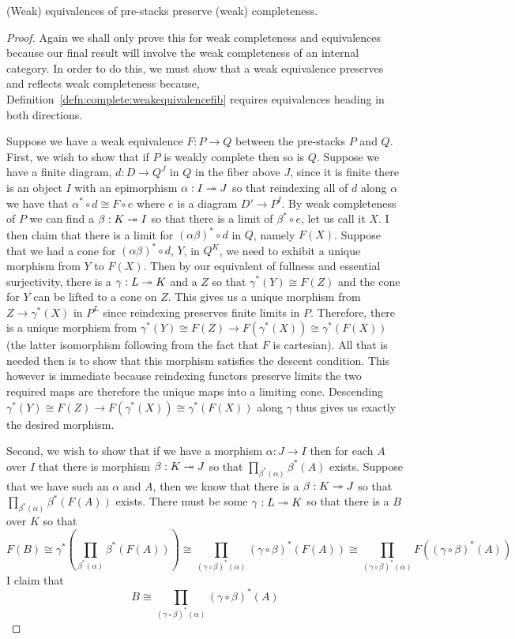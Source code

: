 \begin{thm}\label{prop:complete:completefibrationbroken}
  (Weak) equivalences of pre-stacks preserve (weak) completeness.
\end{thm}
\begin{proof}
  Again we shall only prove this for weak completeness and
  equivalences because our final result will involve the weak
  completeness of an internal category. In order to do this, we must
  show that a weak equivalence preserves and reflects weak
  completeness because,
  Definition~\ref{defn:complete:weakequivalencefib} requires
  equivalences heading in both directions.

  Suppose we have a weak equivalence $F : P \to Q$ between the
  pre-stacks $P$ and $Q$. First, we wish to show that if $P$ is weakly
  complete then so is $Q$. Suppose we have a finite diagram,
  $d : D \to Q^J$ in $Q$ in the fiber above $J$, since it is finite
  there is an object $I$ with an epimorphism $\alpha : I \twoheadrightarrow J$ so
  that reindexing all of $d$ along $\alpha$ we have that
  $\alpha^* \circ d \cong F \circ e$ where $e$ is a diagram
  $D' \to P^I$. By weak completeness of $P$ we can find a
  $\beta : K \twoheadrightarrow I$ so that there is a limit of $\beta^* \circ e$,
  let us call it $X$. I then claim that there is a limit for
  $(\alpha\beta)^* \circ d$ in $Q$, namely $F(X)$. Suppose that we had
  a cone for $(\alpha\beta)^* \circ d$, $Y$, in $Q^K$, we need to
  exhibit a unique morphism from $Y$ to $F(X)$. Then by our equivalent
  of fullness and essential surjectivity, there is a
  $\gamma : L \twoheadrightarrow K$ and a $Z$ so that $\gamma^*(Y) \cong F(Z)$ and
  the cone for $Y$ can be lifted to a cone on $Z$. This gives us a
  unique morphism from $Z \to \gamma^*(X)$ in $P^L$ since reindexing
  preserves finite limits in $P$. Therefore, there is a unique
  morphism from
  $\gamma^*(Y) \cong F(Z) \to F(\gamma^*(X)) \cong \gamma^*(F(X))$
  (the latter isomorphism following from the fact that $F$ is
  cartesian). All that is needed then is to show that this morphism
  satisfies the descent condition. This however is immediate because
  reindexing functors preserve limits the two required maps are
  therefore the unique maps into a limiting cone. Descending
  $\gamma^*(Y) \cong F(Z) \to F(\gamma^*(X)) \cong \gamma^*(F(X))$
  along $\gamma$ thus gives us exactly the desired morphism.

  Second, we wish to show that if we have a morphism
  $\alpha : J \to I$ then for each $A$ over $I$ that there is morphism
  $\beta : K \twoheadrightarrow J$ so that $\prod_{\beta^*(\alpha)} \beta^*(A)$
  exists. Suppose that we have such an $\alpha$ and $A$, then we know
  that there is a $\beta : K \twoheadrightarrow J$ so that
  $\prod_{\beta^*(\alpha)} \beta^*(F(A))$ exists. There must be some
  $\gamma : L \twoheadrightarrow K$ so that there is a $B$ over $K$ so that
  \[
    F(B) \cong \gamma^*(\prod_{\beta^*(\alpha)} \beta^*(F(A)))
    \cong \prod_{(\gamma \circ \beta)^*(\alpha)} (\gamma \circ \beta)^*(F(A))
    \cong \prod_{(\gamma \circ \beta)^*(\alpha)} F((\gamma \circ \beta)^*(A))
  \]
  I claim that
  \[
    B \cong \prod_{(\gamma \circ \beta)^*(\alpha)} (\gamma \circ \beta)^*(A)
  \]
\end{proof}



